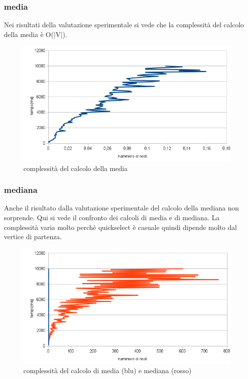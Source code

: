 \documentclass[11pt, a4paper, titlepage, block]{article}
\begin{document}
	\subsubsection{media}
	Nei risultati della valutazione sperimentale si vede che la complessit\`{a} del calcolo della media \`{e} O($|$V$|$).

	\begin{figure}[htp]
	\centering
	\includegraphics[scale=0.80]{img/calcolo_media.png}
	\caption{complessit\`{a} del calcolo della media}
	\end{figure}
	\newpage
	\subsubsection{mediana}
	Anche il risultato dalla valutazione sperimentale del calcolo della mediana non sorprende. Qui si vede il confronto dei calcoli di media e di mediana. 
	La complessit\`{a} varia molto perch\`{e} quickselect \`{e} casuale quindi dipende molto dal vertice di partenza.
	\begin{figure}[htp]
	\centering
	\includegraphics[scale=0.80]{img/calcolo_mediana.png}
	\caption{complessit\`{a} del calcolo di media (blu) e mediana (rosso)}
	\end{figure}
\end{document}
